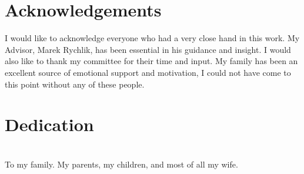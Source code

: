 \thispagestyle{empty}
\maketitle

\thispagestyle{empty}
\iffinal
\chapter*{Acknowledgements}
I would like to acknowledge everyone who had a very close hand in this work. 
My Advisor, Marek Rychlik, has been essential in his guidance and insight. I would also like to thank my committee for their time and input. My family has been an excellent source of emotional support and motivation, I could not have come to this point without any of these people.

\newpage


\thispagestyle{empty}
\chapter*{Dedication}
\begin{center}
	\ \\
	To my family. My parents, my children, and most of all my wife. 
\end{center}
\newpage
\fi


\tableofcontents
\let\tableofcontents\relax

\listoffigures
\let\listoffigures\relax

\listoftables
\let\listoftables\relax

\newpage


